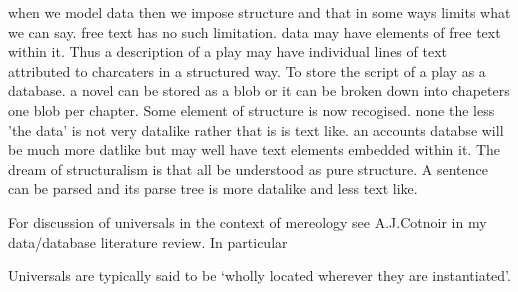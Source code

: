 \begin{noteforfuture}
when we model data then we impose structure and that in some ways limits what we can say.
free text has no such limitation.
data may have elements of free text within it. Thus a description of a play may have individual lines of text attributed to charcaters in a structured way. To store the script of a play as a database. a novel can be stored as a blob or it can be broken down into chapeters one blob per chapter. Some element of structure is now recogised. none the less 'the data' is not very datalike rather that is is text like. an accounts databse will be much more datlike but may well have text elements embedded within it. The dream of structuralism is that all be understood as pure structure. A sentence can be parsed and its parse tree is more datalike and less text like.
\end{noteforfuture}

\begin{noteforfuture}
For discussion of universals in  the context of mereology see A.J.Cotnoir in my data/database literature review. In particular
\begin{erquote}
Universals are typically said to be ‘wholly located wherever they are instantiated’.
\end{erquote}
\end{noteforfuture}